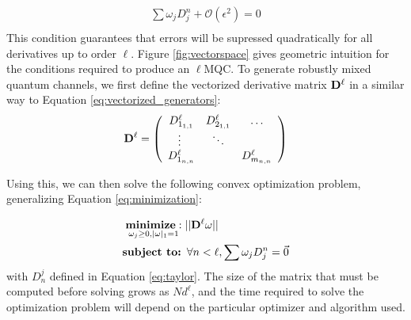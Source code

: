 \documentclass[aps,nofootinbib,pra,notitlepage,twocolumn]{revtex4-1}
\begin{document}
\begin{equation}\label{eq:MQC-relaxed}
\begin{gathered}
\sum\omega_jD^n_j + \mathcal{O}(\epsilon^2) = 0\\
\end{gathered}
\end{equation}
This condition guarantees that errors will be supressed quadratically for all derivatives up to order $\ell$. %
 Figure \ref{fig:vectorspace} gives geometric intuition for the conditions required to produce an $\ell$MQC. To generate robustly mixed quantum channels, we first define the vectorized derivative matrix ${\bold{D}^{\ell}}$ in a similar way to Equation \ref{eq:vectorized_generators}:
\begin{equation}
{\bold{D}^{\ell}} =  \left(\begin{array}{cccc}
		D^\ell_{1_{1,1}} & D^\ell_{2_{1,1}} & \ldots   \\ 
		\vdots\ & \ddots &    \\
		D^\ell_{1_{n,n}} &  &  D^\ell_{m_{n,n}} \\ 
	\end{array} 	
	\right)
\end{equation}

Using this, we can then solve the following convex optimization problem, generalizing Equation \ref{eq:minimization}:

\begin{equation}\label{eq:robust_minimization}
  \begin{split}
    &\underset{\omega_j\geq0, |\omega|_1=1}{\textbf{minimize}: } ||{\bold{D}^{\ell}}\omega||\\
    &\textbf{subject to: } \forall n<\ell, \sum \omega_jD_j^n=\vec{0}\\
  \end{split}
\end{equation}
with $D_n^j$ defined in Equation \ref{eq:taylor}. The size of the matrix that must be computed before solving grows as $Nd^{\ell}$, and the time required to solve the optimization problem will depend on the particular optimizer and algorithm used.
\end{document}
